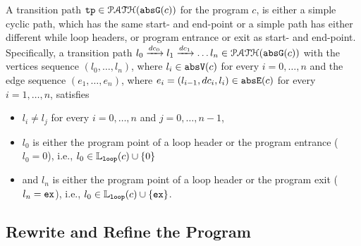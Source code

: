 \begin{defn}
  \label{def:tpath}
A transition path
$\mathtt{tp} \in \mathcal{PATH}(\mathtt{abs}{\mathtt{G}}(c))$ for the program $c$, is either a simple cyclic path, which has the same start- and end-point
or a simple path has either different while loop headers, or program entrance or exit as start- and end-point.
\\
Specifically, a transition path $l_0 \xrightarrow{dc_0} l_1 \xrightarrow{dc_1} \ldots l_n \in \mathcal{PATH}(\mathtt{abs}{\mathtt{G}}(c))$ with the
vertices sequence $(l_0, \ldots, l_n)$, where $l_i \in \mathtt{abs}{\mathtt{V}}(c)$ for every $i = 0, \ldots, n$ and
%
the edge sequence $(e_1, \ldots, e_n)$, where $e_i = (l_{i - 1}, dc_i, l_{i}) \in \mathtt{abs}{\mathtt{E}}(c)$ for every $i = 1, \ldots, n$,
%
satisfies
\begin{itemize}
  \item $l_i \neq l_j$ for every $i = 0, \ldots, n$ and $j = 0, \ldots, {n - 1}$,
  \item $l_0$ is either the program point of a loop header or the program entrance ($l_0 = 0$),
  i.e., $l_0 \in \mathbb{L}_{\mathtt{loop}}(c) \cup \{ 0 \}$
  \item and $l_n$ is either the program point of a loop header or the program exit ($l_n = \mathtt{ex}$),
  i.e., $l_0 \in \mathbb{L}_{\mathtt{loop}}(c) \cup \{ \mathtt{ex} \}$.
\end{itemize}
\end{defn}

\subsection{Rewrite and Refine the Program}
